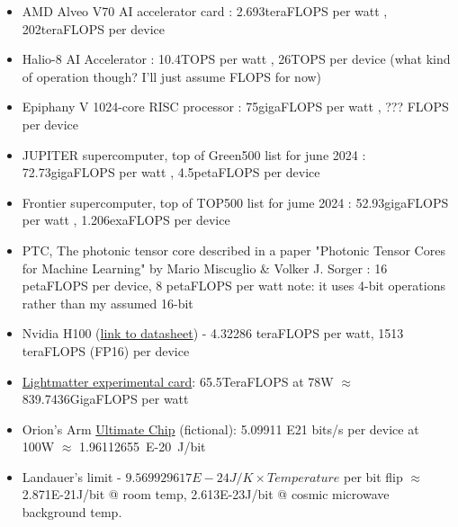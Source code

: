 \documentclass[a4paper]{article}
\begin{document}
	\begin{itemize}
		\item AMD Alveo V70 AI accelerator card : 2.693teraFLOPS per watt , 202teraFLOPS per device
		
		\item Halio-8 AI Accelerator : 10.4TOPS per watt , 26TOPS per device \newline (what kind of operation though? I'll just assume FLOPS for now)
		
		\item Epiphany V 1024-core RISC processor : 75gigaFLOPS per watt , ??? FLOPS per device
		
		\item JUPITER supercomputer, top of Green500 list for june 2024 : \newline 72.73gigaFLOPS per watt , 4.5petaFLOPS per device
		
		\item Frontier supercomputer, top of TOP500 list for jume 2024 : \newline 52.93gigaFLOPS per watt , 1.206exaFLOPS per device
		
		\item PTC, The photonic tensor core described in a paper "Photonic Tensor Cores for Machine Learning" by Mario Miscuglio \& Volker J. Sorger : 16 petaFLOPS per device, 8 petaFLOPS per watt\newline
		note: it uses 4-bit operations rather than my assumed 16-bit
		
		
		\item Nvidia H100 (\href{https://cdn.prod.website-files.com/6473d8d02a3cf26273f27856/64dfa0a0787511212d0575e0_h100-datasheet-2430615.pdf}{link to datasheet}) - 4.32286 teraFLOPS per watt, 1513 teraFLOPS (FP16) per device
		
		
		\item \href{https://lightmatter.co/blog/a-new-kind-of-computer/}{Lightmatter experimental card}: 65.5TeraFLOPS at 78W $\approx$ 839.7436GigaFLOPS per watt
		
		\item Orion's Arm \href{https://www.orionsarm.com/eg-article/48507b746e356}{Ultimate Chip} (fictional): 5.09911 E21 bits/s per device at 100W $\approx$ 1.96112655~E-20~J/bit
		
		\item Landauer's limit - $9.569929617 E-24 J/K \times Temperature$ per bit flip\newline
		$\approx$ 2.871E-21J/bit @ room temp, 2.613E-23J/bit @ cosmic microwave background temp.
	\end{itemize}
	
\end{document}
